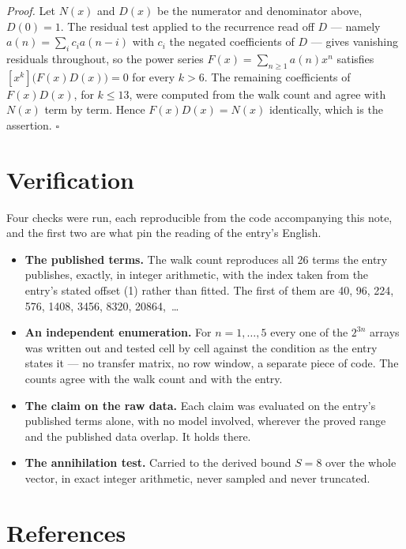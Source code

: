 \documentclass[11pt]{article}
\theoremstyle{definition}
\begin{document}
{\itshape Proof.} Let $N(x)$ and $D(x)$ be the numerator and denominator above, $D(0)=1$. The residual test applied to the recurrence read off $D$ --- namely $a(n) = \sum_i c_i a(n-i)$ with $c_i$ the negated coefficients of $D$ --- gives vanishing residuals throughout, so the power series $F(x)=\sum_{n\ge 1}a(n)x^n$ satisfies $[x^k]\bigl(F(x)D(x)\bigr) = 0$ for every $k > 6$. The remaining coefficients of $F(x)D(x)$, for $k \le 13$, were computed from the walk count and agree with $N(x)$ term by term. Hence $F(x)D(x) = N(x)$ identically, which is the assertion. $\square$

\section{Verification}

Four checks were run, each reproducible from the code accompanying this note, and the first two are what pin the reading of the entry's English.

\begin{itemize}

\item {\bfseries The published terms.} The walk count reproduces all 26 terms the entry publishes, exactly, in integer arithmetic, with the index taken from the entry's stated offset (1) rather than fitted. The first of them are 40, 96, 224, 576, 1408, 3456, 8320, 20864,~\dots

\item {\bfseries An independent enumeration.} For $n = 1,\dots,5$ every one of the $2^{3n}$ arrays was written out and tested cell by cell against the condition as the entry states it --- no transfer matrix, no row window, a separate piece of code. The counts agree with the walk count and with the entry.

\item {\bfseries The claim on the raw data.} Each claim was evaluated on the entry's published terms alone, with no model involved, wherever the proved range and the published data overlap. It holds there.

\item {\bfseries The annihilation test.} Carried to the derived bound $S = 8$ over the whole vector, in exact integer arithmetic, never sampled and never truncated.

\end{itemize}

\section{References}
\end{document}
